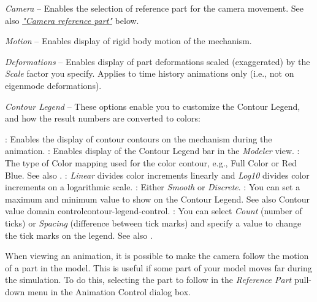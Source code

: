\begin{bulletlist}
\item{\sl Camera} --
  Enables the selection of reference part for the camera movement. See also
  \protect\hyperlink{camera-reference-part}{\sl"Camera reference part"} below.
\item{\sl Motion} --
  Enables display of rigid body motion of the mechanism.
\item{\sl Deformations} --
  Enables display of part deformations scaled (exaggerated) by the {\sl Scale}
  factor you specify. Applies to time history animations only
  (i.e., not on eigenmode deformations).
\item{\sl Contour Legend} -- \newline
  These options enable you to customize the Contour Legend, and how the result
  numbers are converted to colors:

  \begin{itemize}
   : Enables the
    display of contour contours on the mechanism during the animation.
   :
    Enables display of the Contour Legend bar in the {\sl Modeler} view.
   :
    The type of Color mapping used for the color contour, e.g.,
    Full Color or Red Blue. See also
    .
   :
    {\sl Linear} divides color increments linearly and
    {\sl Log10} divides color increments on a logarithmic scale.
   :
    Either {\sl Smooth} or {\sl Discrete}.
   :
    You can set a maximum and minimum value to show on the Contour Legend.
    See also 
    {Contour value domain control}{contour-legend-control}.
   :
    You can select {\sl Count} (number of ticks) or {\sl Spacing}
    (difference between tick marks) and specify a value to change
    the tick marks on the legend.
    See also .
  \end{itemize}
\end{bulletlist}


When viewing an animation, it is possible to make the camera follow the motion
of a part in the model. This is useful if some part of your model moves far
during the simulation. To do this, selecting the part to follow in the
{\sl Reference Part} pull-down menu in the Animation Control dialog box.


